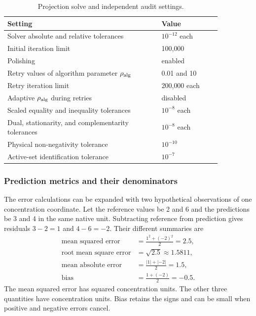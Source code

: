 \begin{table}[htbp]
\centering\small
\caption{Projection solve and independent audit settings.}
\label{tab:plant_projection_settings}
\begin{tabular}{p{0.62\linewidth}p{0.24\linewidth}}
\toprule Setting & Value\\\midrule
Solver absolute and relative tolerances & $10^{-12}$ each\\
Initial iteration limit & 100{,}000\\
Polishing & enabled\\
Retry values of algorithm parameter $\rho_{\rm alg}$ & 0.01 and 10\\
Retry iteration limit & 200{,}000 each\\
Adaptive $\rho_{\rm alg}$ during retries & disabled\\
Scaled equality and inequality tolerances & $10^{-8}$ each\\
Dual, stationarity, and complementarity tolerances & $10^{-8}$ each\\
Physical non-negativity tolerance & $10^{-10}$\\
Active-set identification tolerance & $10^{-7}$\\
\bottomrule
\end{tabular}
\end{table}

\subsubsection{Prediction metrics and their denominators}

The error calculations can be expanded with two hypothetical observations of one concentration coordinate. Let the reference values be 2 and 6 and the predictions be 3 and 4 in the same native unit. Subtracting reference from prediction gives residuals $3-2=1$ and $4-6=-2$. Their different summaries are
\[
\begin{aligned}
\text{mean squared error}&=\frac{1^2+(-2)^2}{2}=2.5,\\
\text{root mean square error}&=\sqrt{2.5}\approx1.5811,\\
\text{mean absolute error}&=\frac{|1|+|-2|}{2}=1.5,\\
\text{bias}&=\frac{1+(-2)}{2}=-0.5.
\end{aligned}
\]
The mean squared error has squared concentration units. The other three quantities have concentration units. Bias retains the signs and can be small when positive and negative errors cancel.

